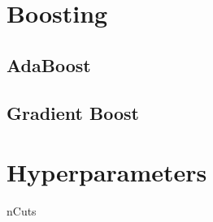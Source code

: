 
\section{Boosting}\label{sec:bdt:boosting}

\subsection{AdaBoost}\label{sub:bdt:boosting:adaboost}

\subsection{Gradient Boost}\label{sub:bdt:boosting:gradient_boost}

\section{Hyperparameters}\label{sec:bdt:hyperparameters}

nCuts
